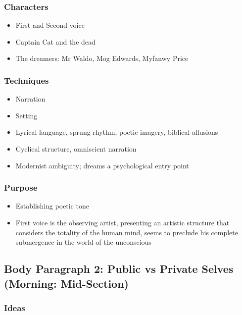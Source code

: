 		\subsubsection{Characters}

			\begin{itemize}
				\item First and Second voice
				\item Captain Cat and the dead
				\item The dreamers: Mr Waldo, Mog Edwards, Myfanwy Price
			\end{itemize}

		\subsubsection{Techniques}
		
			\begin{itemize}
				\item Narration
				\item Setting
				\item Lyrical language, sprung rhythm, poetic imagery, biblical allusions
				\item Cyclical structure, omniscient narration
				\item Modernist ambiguity; dreams a psychological entry point
			\end{itemize}

		\subsubsection{Purpose}
			
			\begin{itemize}
				\item Establishing poetic tone
				\item First voice is the observing artist, presenting an artistic structure that considers the totality of the human mind, seems to preclude his complete submergence in the world of the unconscious
			\end{itemize}

	\subsection{Body Paragraph 2: Public vs Private Selves (Morning: Mid-Section)} \label{26/05/2025}
	
		\subsubsection{Ideas}
		
